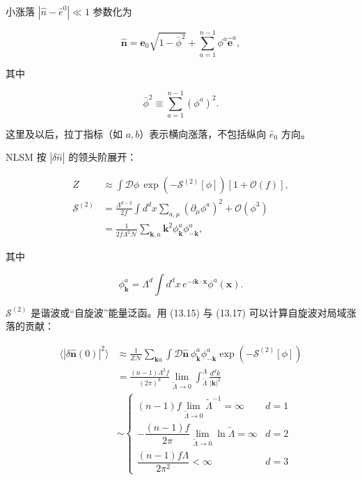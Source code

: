 小涨落 $|\hat{n}-\hat{e}^{0}| \ll 1$ 参数化为

\begin{equation*}
\hat {\mathbf {n}} = \hat {\mathbf {e}} _ {0} \sqrt {1 - \bar {\phi} ^ {2}} + \sum_ {a = 1} ^ {n - 1} \phi^ {a} \hat {\mathbf {e}} ^ {a} ,
\tag{13.15}
\end{equation*}

其中

\begin{equation*}
\bar {\phi} ^ {2} \equiv \sum_ {a = 1} ^ {n - 1} \left( \phi^ {a} \right) ^ {2}.
\tag{13.16}
\end{equation*}

这里及以后，拉丁指标（如 $a, b$）表示横向涨落，不包括纵向 $\hat{e}_{0}$ 方向。

NLSM 按 $|\delta\hat{n}|$ 的领头阶展开：

\begin{align*}
Z & \approx \int \mathcal {D} \phi \, \exp \left( - \mathcal {S} ^ {(2)} [ \phi ] \right) \left[ 1 + \mathcal {O} ( f ) \right] ,\\
\mathcal {S} ^ {(2)} & = \frac {\Lambda^ {d - 2}}{2 f} \int d ^ {d} x \sum_ {a, \mu} \left( \partial_ {\mu} \phi^ {a} \right) ^ {2} + \mathcal {O} ( \phi^ {3} )\\
& = \frac {1}{2 f \Lambda^ {2} \mathcal {N}} \sum_{\mathbf {k}, a} \mathbf {k} ^ {2} \phi_{\mathbf {k}} ^ {a} \phi_{- \mathbf {k}} ^ {a} ,
\tag{13.17}
\end{align*}

其中

\begin{equation*}
\phi_ {\mathbf {k}} ^ {a} = \Lambda^ {d} \int d ^ {d} x \, e ^ {- i \mathbf {k} \cdot \mathbf {x}} \phi^ {a} ( \mathbf {x} ).
\tag{13.18}
\end{equation*}

$\mathcal{S}^{(2)}$ 是谐波或“自旋波”能量泛函。用 (13.15) 与 (13.17) 可以计算自旋波对局域涨落的贡献：

\begin{align*}
\langle \left| \delta \hat {\mathbf {n}} ( 0 ) \right| ^ {2} \rangle & \approx \frac {1}{Z \mathcal {N}} \sum_{\mathbf {k} a} \int \mathcal {D} \hat {\mathbf {n}} \, \phi_{\mathbf {k}} ^ {a} \phi_{- \mathbf {k}} ^ {a} \exp \left( - \mathcal {S} ^ {(2)} [ \phi ] \right)\\
& = \frac {( n - 1 ) \Lambda^ {2} f}{( 2 \pi ) ^ {d}} \lim_{\tilde {\Lambda} \to 0} \int_{\tilde {\Lambda}} ^ {\Lambda} \frac {d ^ {d} k}{| \mathbf {k} | ^ {2}}\\
& \sim \left\{ \begin{array}{ll} ( n - 1 ) f \lim_{\tilde {\Lambda} \to 0} \tilde {\Lambda} ^ {- 1} = \infty & d = 1 \\ - \dfrac {( n - 1 ) f}{2 \pi} \lim_{\tilde {\Lambda} \to 0} \ln \tilde {\Lambda} = \infty & d = 2 \\[4pt] \dfrac {( n - 1 ) f \Lambda}{2 \pi^ {2}} < \infty & d = 3 \end{array} \right.
\tag{13.19}
\end{align*}

